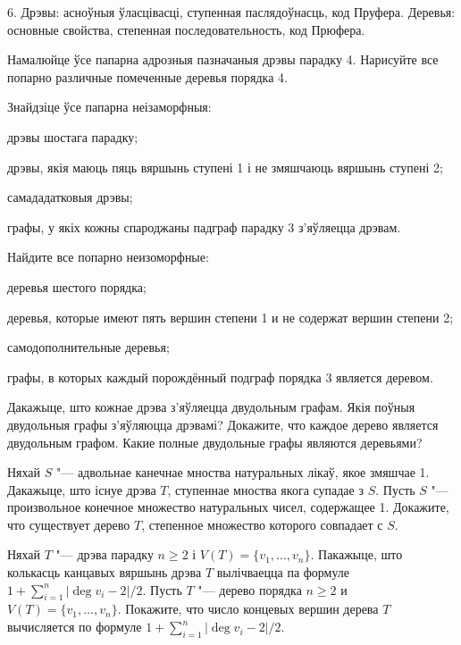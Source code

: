 \documentclass[12pt, a4paper]{article}
\begin{document}
\biLangHeader
{6. Дрэвы: асноўныя ўласцівасці, ступенная паслядоўнасць, код Пруфера.}
{Деревья: основные свойства, степенная последовательность, код Прюфера.}

\begin{problemList}

\problemItemSimple
{Намалюйце ўсе папарна адрозныя пазначаныя дрэвы парадку 4.}
{Нарисуйте все попарно различные помеченные деревья порядка 4.}

\bigskip

\problemItemSimple
{%
Знайдзіце ўсе папарна неізаморфныя:
\begin{belarusianEnumerate}
    \item дрэвы шостага парадку;
    \item дрэвы, якія маюць пяць вяршынь ступені 1 і не змяшчаюць вяршынь ступені 2;
    \item самададатковыя дрэвы;
    \item графы, у якіх кожны спароджаны падграф парадку 3 з'яўляецца дрэвам.
\end{belarusianEnumerate}
}
{%
Найдите все попарно неизоморфные:
\begin{russianEnumerate}
    \item деревья шестого порядка;
    \item деревья, которые имеют пять вершин степени 1 и не содержат вершин степени 2;
    \item самодополнительные деревья;
    \item графы, в которых каждый порождённый подграф порядка 3 является деревом.
\end{russianEnumerate}
}

\bigskip

\problemItemSimple
{Дакажыце, што кожнае дрэва з'яўляецца двудольным графам.
Якія поўныя двудольныя графы з'яўляюцца дрэвамі?}
{Докажите, что каждое дерево является двудольным графом.
Какие полные двудольные графы являются деревьями?}

\bigskip

\problemItemSimple
{Няхай $S$ "--- адвольнае канечнае мноства натуральных лікаў, якое змяшчае 1.
Дакажыце, што існуе дрэва $T$, ступеннае мноства якога супадае з $S$.}
{Пусть $S$ "--- произвольное конечное множество натуральных чисел, содержащее 1.
Докажите, что существует дерево $T$, степенное множество которого совпадает с $S$.}

\bigskip

\problemItemSimple
{Няхай $T$ "--- дрэва парадку $n\ge 2$ і $V(T)=\{v_1, \ldots, v_n\}$. Пакажыце, што колькасць канцавых вяршынь дрэва $T$ вылічваецца па формуле $1+\sum\limits_{i=1}^n |\deg v_i - 2|/2$.}
{Пусть $T$ "--- дерево порядка $n\ge 2$ и $V(T)=\{v_1, \ldots, v_n\}$. Покажите, что число концевых вершин дерева $T$ вычисляется по формуле $1+\sum\limits_{i=1}^n |\deg v_i - 2|/2$.}


\end{problemList}
\end{document}
